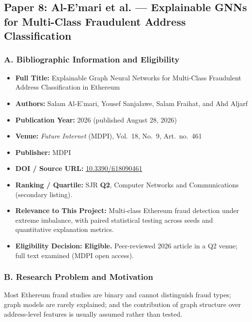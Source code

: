 \documentclass[11pt,a4paper]{article}
\begin{document}
\subsection{Paper 8: Al-E'mari et al. --- Explainable GNNs for Multi-Class Fraudulent Address Classification}
\label{sec:p8_alemari}

\subsubsection*{A. Bibliographic Information and Eligibility}
\begin{itemize}[leftmargin=*]
    \item \textbf{Full Title:} Explainable Graph Neural Networks for Multi-Class Fraudulent Address Classification in Ethereum
    \item \textbf{Authors:} Salam Al-E'mari, Yousef Sanjalawe, Salam Fraihat, and Ahd Aljarf
    \item \textbf{Publication Year:} 2026 (published August 28, 2026)
    \item \textbf{Venue:} \textit{Future Internet} (MDPI), Vol.~18, No.~9, Art.\ no.\ 461
    \item \textbf{Publisher:} MDPI
    \item \textbf{DOI / Source URL:} \href{https://doi.org/10.3390/fi18090461}{10.3390/fi18090461}
    \item \textbf{Ranking / Quartile:} SJR \textbf{Q2}, Computer Networks and Communications (secondary listing).
    \item \textbf{Relevance to This Project:} Multi-class Ethereum fraud detection under extreme imbalance, with paired statistical testing across seeds and quantitative explanation metrics.
    \item \textbf{Eligibility Decision:} \textbf{Eligible.} Peer-reviewed 2026 article in a Q2 venue; full text examined (MDPI open access).
\end{itemize}

\subsubsection*{B. Research Problem and Motivation}
Most Ethereum fraud studies are binary and cannot distinguish fraud types; graph models are rarely explained; and the contribution of graph structure over address-level features is usually assumed rather than tested.
\end{document}
